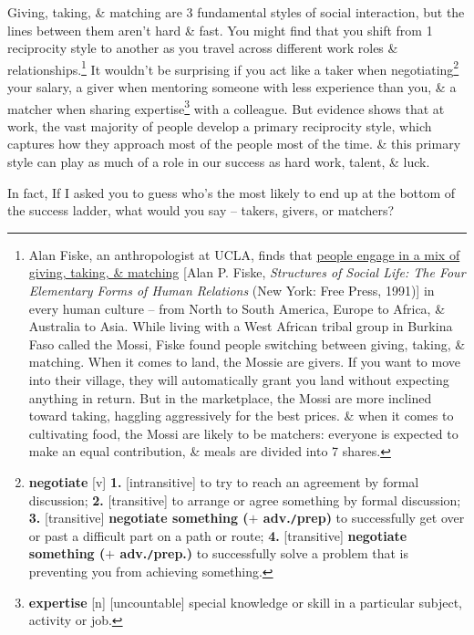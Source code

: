 \documentclass[oneside]{book}
\numberwithin{equation}{section}
\begin{document}
Giving, taking, \& matching are 3 fundamental styles of social interaction, but the lines between them aren't hard \& fast. You might find that you shift from 1 reciprocity style to another as you travel across different work roles \& relationships.\footnote{Alan Fiske, an anthropologist at UCLA, finds that \underline{people engage in a mix of giving, taking, \& matching} [Alan P. Fiske, \textit{Structures of Social Life: The Four Elementary Forms of Human Relations} (New York: Free Press, 1991)] in every human culture -- from North to South America, Europe to Africa, \& Australia to Asia. While living with a West African tribal group in Burkina Faso called the Mossi, Fiske found people switching between giving, taking, \& matching. When it comes to land, the Mossie are givers. If you want to move into their village, they will automatically grant you land without expecting anything in return. But in the marketplace, the Mossi are more inclined toward taking, haggling aggressively for the best prices. \& when it comes to cultivating food, the Mossi are likely to be matchers: everyone is expected to make an equal contribution, \& meals are divided into 7 shares.} It wouldn't be surprising if you act like a taker when negotiating\footnote{\textbf{negotiate} [v] \textbf{1.} [intransitive] to try to reach an agreement by formal discussion; \textbf{2.} [transitive] to arrange or agree something by formal discussion; \textbf{3.} [transitive] \textbf{negotiate something ($+$ adv.\texttt{/}prep)} to successfully get over or past a difficult part on a path or route; \textbf{4.} [transitive] \textbf{negotiate something ($+$ adv.\texttt{/}prep.)} to successfully solve a problem that is preventing you from achieving something.} your salary, a giver when mentoring someone with less experience than you, \& a matcher when sharing expertise\footnote{\textbf{expertise} [n] [uncountable] special knowledge or skill in a particular subject, activity or job.} with a colleague. But evidence shows that at work, the vast majority of people develop a primary reciprocity style, which captures how they approach most of the people most of the time. \& this primary style can play as much of a role in our success as hard work, talent, \& luck.

In fact,  If I asked you to guess who's the most likely to end up at the bottom of the success ladder, what would you say -- takers, givers, or matchers?
\end{document}

